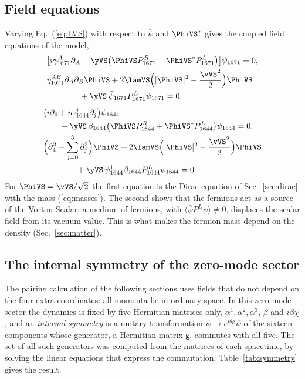 \subsection{Field equations}

Varying Eq.~(\ref{eq:LVS}) with respect to $\bar\psi$ and $\PhiVS^*$ gives the coupled field equations
of the model,
\begin{align}
&\big[i\gamma_{1671}^A\partial_A-\yVS\big(\PhiVS P_{1671}^{R}+\PhiVS^{*}P_{1671}^{L}\big)\big]\psi_{1671}=0,\nonumber\\
&\eta_{1671}^{AB}\partial_A\partial_B\PhiVS+2\lamVS\Big(|\PhiVS|^2-\frac{\vVS^2}{2}\Big)\PhiVS\nonumber\\
&\qquad\qquad+\yVS\,\bar\psi_{1671}P_{1671}^{L}\psi_{1671}=0 .
\label{eq:fieldeqs}
\end{align}
\begin{align}
&\big(i\partial_4+i\alpha_{1644}^j\partial_j\big)\psi_{1644}\nonumber\\
&\qquad-\yVS\,\beta_{1644}\big(\PhiVS P_{1644}^{R}+\PhiVS^{*}P_{1644}^{L}\big)\psi_{1644}=0,\nonumber\\
&\Big(\partial_4^2-\sum_{j=0}^{3}\partial_j^2\Big)\PhiVS+2\lamVS\Big(|\PhiVS|^2-\frac{\vVS^2}{2}\Big)\PhiVS\nonumber\\
&\qquad\qquad+\yVS\,\psi_{1644}^\dagger\beta_{1644}P_{1644}^{L}\psi_{1644}=0 .
\label{eq:fieldeqs}
\end{align}
For $\PhiVS=\vVS/\sqrt2$ the first equation is the Dirac equation of Sec.~\ref{sec:dirac} with the
mass (\ref{eq:masses}). The second shows that the fermions act as a source of the Vorton-Scalar: a
medium of fermions, with $\langle\bar\psi P^{L}\psi\rangle\neq0$, displaces the scalar field from its
vacuum value. This is what makes the fermion mass depend on the density (Sec.~\ref{sec:matter}).

\subsection{The internal symmetry of the zero-mode sector}
\label{sec:internal}

The pairing calculation of the following sections uses fields that do not depend on the four extra
coordinates: all momenta lie in ordinary space. In this zero-mode sector the dynamics is fixed by five
Hermitian matrices only, $\alpha^1,\alpha^2,\alpha^3$, $\beta$ and $i\beta\chi$, and an \emph{internal
symmetry} is a unitary transformation $\psi\to e^{i\theta\mathsf g}\psi$ of the sixteen components whose
generator, a Hermitian matrix $\mathsf g$, commutes with all five. The set of all such generators was computed from the matrices of
each spacetime, by solving the linear equations that express the commutation.
Table~\ref{tab:symmetry} gives the result.

